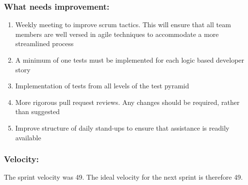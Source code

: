 \documentclass[10pt,onecolumn]{witseiepaper}
\begin{document}
\subsubsection*{What needs improvement:}
\begin{enumerate}
	\item Weekly meeting to improve scrum tactics. This will ensure that all team members are well versed in agile techniques to accommodate a more streamlined process
	\item A minimum of one tests must be implemented for each logic based developer story 
	\item Implementation of tests from all levels of the test pyramid
	\item More rigorous pull request reviews. Any changes should be required, rather than suggested
	\item Improve structure of daily stand-ups to ensure that assistance is readily available 
\end{enumerate}

\subsubsection*{Velocity:}
The sprint velocity was 49. The ideal velocity for the next sprint is therefore 49.
\end{document}
